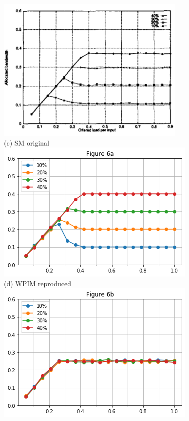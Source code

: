 \begin{figure}
        \includegraphics[width=\linewidth]{figures/stiliadis_fig6c_original.png}\\
        (c) SM original
    \endminipage\hfill
        \centering
        \includegraphics[width=\linewidth]{figures/stiliadis_fig6a.png}\\
        (d) WPIM reproduced
    \endminipage\hfill
        \centering
        \includegraphics[width=\linewidth]{figures/stiliadis_fig6b.png}\\

\end{figure}
